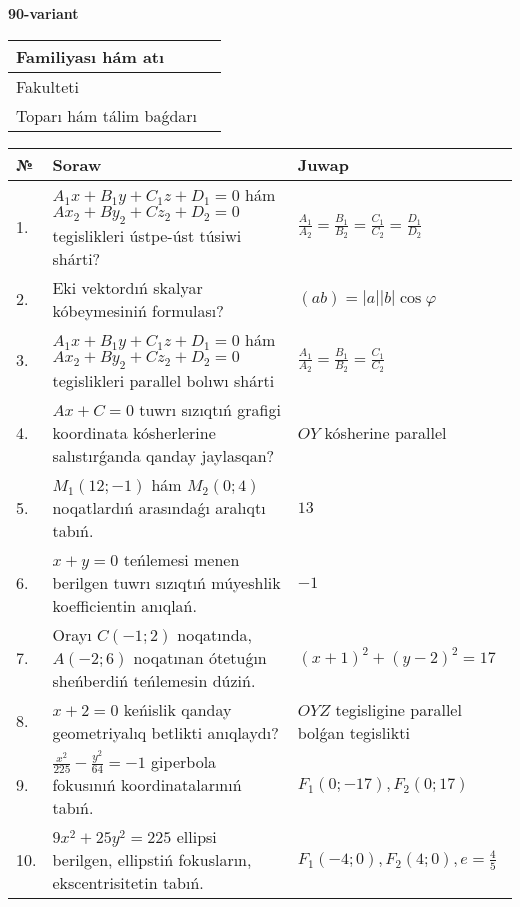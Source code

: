 \documentclass{article}
\begin{document}
\egroup

\newpage


\textbf{90-variant}\\

\bgroup
\def\arraystretch{1.6} %

\begin{tabular}{|m{5.7cm}|m{9.5cm}|}
\hline
Familiyası hám atı & \\
\hline
Fakulteti  & \\
\hline
Toparı hám tálim baǵdarı  & \\
\hline
\end{tabular}

\vspace{1cm}

\begin{tabular}{|m{0.7cm}|m{10cm}|m{4cm}|}
\hline
№ & Soraw & Juwap \\
\hline
1. & $A_1x+B_1y+C_1z+D_1=0$ hám $Ax_2+By_2+Cz_2+D_2=0$ tegislikleri ústpe-úst túsiwi shárti? & $\frac{A_1}{A_2}=\frac{B_1}{B_2}=\frac{C_1}{C_2}=\frac{D_1}{D_2}$ \\
\hline
2. & Eki vektordıń skalyar kóbeymesiniń formulası? & $(ab)=|a||b|\cos\varphi$ \\
\hline
3. & $A_1x+B_1y+C_1z+D_1=0$ hám $Ax_2+By_2+Cz_2+D_2=0$ tegislikleri parallel bolıwı shárti & $\frac{A_1}{A_2}=\frac{B_1}{B_2}=\frac{C_1}{C_2}$ \\
\hline
4. & $Ax+C=0$ tuwrı sızıqtıń grafigi koordinata kósherlerine salıstırǵanda qanday jaylasqan? & $OY$ kósherine parallel \\
\hline
5. & $M_{1} (12;-1)$ hám $M_{2} (0;4)$ noqatlardıń arasındaǵı aralıqtı tabıń. & $13$ \\
\hline
6. & $x+y=0$ teńlemesi menen berilgen tuwrı sızıqtıń múyeshlik koefficientin anıqlań. & $- 1$ \\
\hline
7. & Orayı $C (-1;2)$ noqatında, $A (-2;6 )$ noqatınan ótetuǵın sheńberdiń teńlemesin dúziń. & $(x+1)^{2}+(y-2)^{2}=17$ \\
\hline
8. & $x+2=0$ keńislik qanday geometriyalıq betlikti anıqlaydı? &  $OYZ$ tegisligine parallel bolǵan tegislikti \\
\hline
9. & $\frac{x^{2}}{225}-\frac{y^{2}}{64}=-1$ giperbola fokusınıń koordinatalarınıń tabıń. & $F_{1}(0;-17), F_{2}(0;17)$ \\
\hline
10. & $9x^{2}+25y^{2}=225$ ellipsi berilgen, ellipstiń fokusların, ekscentrisitetin tabıń. & $F_1\left(-4;0 \right) , F_2\left( 4;0 \right) , e = \frac{4}{5}$ \\
\hline
\end{tabular}
\end{document}
